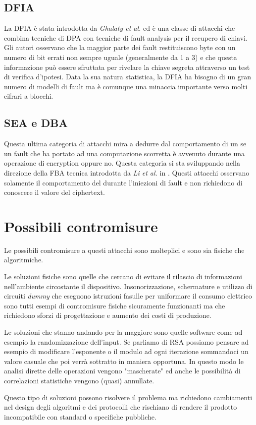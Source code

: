 		\subsection*{\ac{DFIA}}
			La \ac{DFIA} è stata introdotta da \emph{Ghalaty et al.}\cite{ghalaty2014differential} ed è una classe di attacchi che combina tecniche di \ac{DPA} con tecniche di fault analysis per il recupero di chiavi\cite{fuhr2013fault}. Gli autori osservano che la maggior parte dei fault restituiscono byte con un numero di bit errati non sempre uguale (generalmente da 1 a 3) e che questa informazione può essere sfruttata per rivelare la chiave segreta attraverso un test di verifica d'ipotesi. Data la sua natura statistica, la \ac{DFIA} ha bisogno di un gran numero di modelli di fault ma è comunque una minaccia importante verso molti cifrari a blocchi.
			
		\subsection*{\ac{SEA} e \ac{DBA}}
			Questa ultima categoria di attacchi mira a dedurre dal comportamento di un \disps se un fault che ha portato ad una computazione scorretta è avvenuto durante una operazione di encryption oppure no\cite{robisson2007differential}. Questa categoria si sta sviluppando nella direzione della \ac{FBA} tecnica introdotta da \emph{Li et al.} in \cite{li2014yet}. Questi attacchi osservano solamente il comportamento del \disps durante l'iniezioni di fault e non richiedono di conoscere il valore del ciphertext.
			
	\section{Possibili contromisure}	
		Le possibili contromisure a questi attacchi sono molteplici e sono sia fisiche che algoritmiche.
		
		Le soluzioni fisiche sono quelle che cercano di evitare il rilascio di informazioni nell'ambiente circostante il dispositivo. Insonorizzazione, schermature e utilizzo di circuiti \emph{dummy} che eseguono istruzioni fasulle per uniformare il consumo elettrico sono tutti esempi di contromisure fisiche sicuramente funzionanti ma che richiedono sforzi di progettazione e aumento dei costi di produzione.
		
		Le soluzioni che stanno andando per la maggiore sono quelle software come ad esempio la randomizzazione dell'input. Se parliamo di RSA possiamo pensare ad esempio di modificare l'esponente o il modulo ad ogni iterazione sommandoci un valore casuale che poi verrà sottratto in maniera opportuna. In questo modo le analisi dirette delle operazioni vengono "mascherate" ed anche le possibilità di correlazioni statistiche vengono (quasi) annullate.
		
		Questo tipo di soluzioni possono risolvere il problema ma richiedono cambiamenti nel design degli algoritmi e dei protocolli che rischiano di rendere il prodotto incompatibile con standard o specifiche pubbliche.